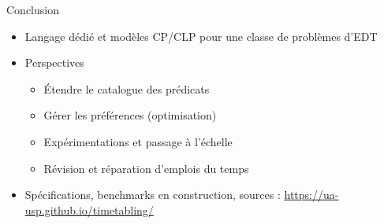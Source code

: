 \documentclass{beamer}
\begin{document}


\begin{frame}{Conclusion}
    \begin{itemize}
    \item Langage dédié et modèles CP/CLP pour une classe de problèmes d'EDT
        \item Perspectives 
        \begin{itemize}
            \item Étendre le catalogue des prédicats
            \item Gérer les préférences (optimisation)
            \item Expérimentations et passage à l'échelle
            \item Révision et réparation d'emplois du temps
        \end{itemize}
    \end{itemize}
    \begin{itemize}
        \item Spécifications, benchmarks \lbrack en construction\rbrack, sources : \url{https://ua-usp.github.io/timetabling/} 
    \end{itemize}
\end{frame}


\end{document}
